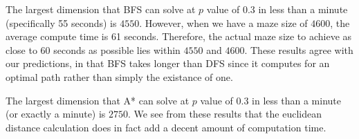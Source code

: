 \documentclass[12pt, twoside]{article}
\begin{document}
\begin{enumerate}
        \vspace{4mm}
        The largest dimension that BFS can solve at $p$ value of 0.3 in less than a minute (specifically 55 seconds) is $4550$. However, when we have a maze size of $4600$, the average compute time is 61 seconds. Therefore, the actual maze size to achieve as close to 60 seconds as possible lies within $4550$ and $4600$. These results agree with our predictions, in that BFS takes longer than DFS since it computes for an optimal path rather than simply the existance of one.

        \vspace{4mm}
        The largest dimension that A* can solve at $p$ value of 0.3 in less than a minute (or exactly a minute) is $2750$. We see from these results that the euclidean distance calculation does in fact add a decent amount of computation time. 

\end{enumerate}
 
 
\end{document}
